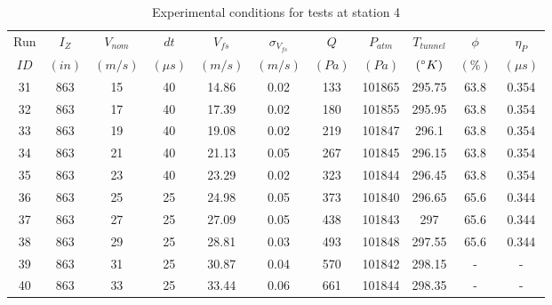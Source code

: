 \begin{table}[H]
\begin{center}
\begin{tabular}{|ccccccccccc|}
	\hline
	Run & $I_Z$ & $V_{nom}$ & $dt$ & $V_{fs}$ & $\sigma_{V_{fs}}$ & $Q$ & $P_{atm}$ & $T_{tunnel}$ & $\phi$ & $\eta_P$\\
	$ID$ & $(in)$ & $(m/s)$ & $(\mu s)$ & $(m/s)$ & $(m/s)$ & $(Pa)$ & $(Pa)$ & $(\degree K)$ & $(\%)$ & $(\mu s)$\\
	\hline
	31 & 863 & 15 & 40 & 14.86 & 0.02 & 133 & 101865 & 295.75 & 63.8 & 0.354\\
	32 & 863 & 17 & 40 & 17.39 & 0.02 & 180 & 101855 & 295.95 & 63.8 & 0.354\\
	33 & 863 & 19 & 40 & 19.08 & 0.02 & 219 & 101847 & 296.1 & 63.8 & 0.354\\
	34 & 863 & 21 & 40 & 21.13 & 0.05 & 267 & 101845 & 296.15 & 63.8 & 0.354\\
	35 & 863 & 23 & 40 & 23.29 & 0.02 & 323 & 101844 & 296.45 & 63.8 & 0.354\\
	36 & 863 & 25 & 25 & 24.98 & 0.05 & 373 & 101840 & 296.65 & 65.6 & 0.344\\
	37 & 863 & 27 & 25 & 27.09 & 0.05 & 438 & 101843 & 297 & 65.6 & 0.344\\
	38 & 863 & 29 & 25 & 28.81 & 0.03 & 493 & 101848 & 297.55 & 65.6 & 0.344\\
	39 & 863 & 31 & 25 & 30.87 & 0.04 & 570 & 101842 & 298.15 & - & -\\
	40 & 863 & 33 & 25 & 33.44 & 0.06 & 661 & 101844 & 298.35 & - & -\\
	\hline
\end{tabular}
\caption{Experimental conditions for tests at station 4}
\label{table:station_4_measurements.}
\end{center}
\end{table}
